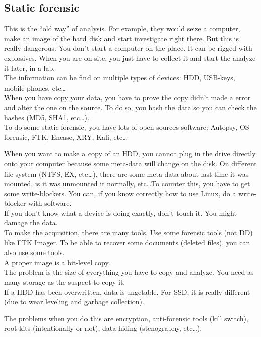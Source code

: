 \subsection{Static forensic}
This is the \enquote{old way} of analysis. For example, they would seize a computer, make an image of the hard disk and start investigate right there. But this is really dangerous. You don't start a computer on the place. It can be rigged with explosives. When you are on site, you just have to collect it and start the analyze it later, in a lab.\\
The information can be find on multiple types of devices: HDD, USB-keys, mobile phones, etc\ldots\\
When you have copy your data, you have to prove the copy didn't made a error and alter the one on the source. To do so, you hash the data so you can check the hashes (MD5, SHA1, etc\ldots).\\
To do some static forensic, you have lots of open sources software: Autopsy, OS forensic, FTK, Encase, XRY, Kali, etc\ldots\\\par
When you want to make a copy of an HDD, you cannot plug in the drive directly onto your computer because some meta-data will change on the disk. On different file system (NTFS, EX, etc\ldots), there are some meta-data about last time it was mounted, is it was unmounted it normally, etc\ldots To counter this, you have to get some write-blockers. You can, if you know correctly how to use Linux, do a write-blocker with software.\\
If you don't know what a device is doing exactly, don't touch it. You might damage the data.\\
To make the acquisition, there are many tools. Use some forensic tools (not DD) like FTK Imager. To be able to recover some documents (deleted files), you can also use some tools.\\
A proper image is a bit-level copy.\\
The problem is the size of everything you have to copy and analyze. You need as many storage as the suspect to copy it.\\
If a HDD has been overwritten, data is ungetable. For SSD, it is really different (due to wear leveling and garbage collection).\\\par
The problems when you do this are encryption, anti-forensic tools (kill switch), root-kits (intentionally or not), data hiding (stenography, etc\ldots).
